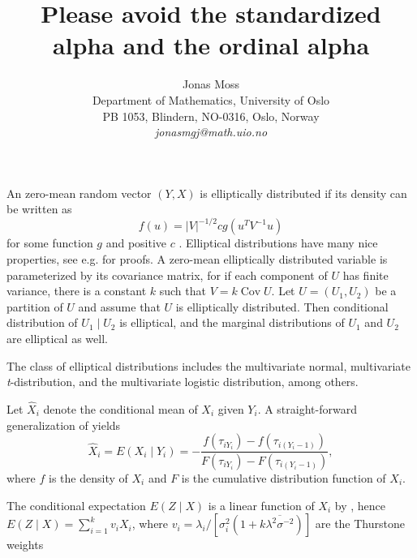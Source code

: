 \documentclass[twoside]{article}
\title{Please avoid the standardized alpha and the ordinal alpha}
\author{
  Jonas Moss \orcid{0000-0002-6876-6964} \\
  Department of Mathematics, University of Oslo\\
  PB 1053, Blindern, NO-0316, Oslo, Norway \\
  \it{jonasmgj@math.uio.no}
}
\DeclareMathOperator{\Cov}{Cov}
\DeclareMathOperator{\tsum}{\textstyle \sum}
\begin{document}
\maketitle



An zero-mean random vector $(Y,X)$ is elliptically distributed if its density can be written as
\begin{equation}
    f(u) = |V|^{-1/2}cg(u^T V^{-1}u)
\end{equation}
for some function $g$ and positive $c$ \citep{Lee1988-sw}. 
Elliptical distributions have many nice properties, see e.g. \citet{Cambanis1981-eg} for proofs.
A zero-mean elliptically distributed variable is parameterized by its covariance matrix, for if each component of $U$ has finite variance, there is a constant $k$ such that $V = k\Cov U$. Let $U = (U_1,U_2)$ be a partition of $U$ and assume that $U$ is elliptically distributed. Then conditional distribution of $U_1 \mid U_2$ is elliptical, and the marginal distributions of $U_1$ and $U_2$ are elliptical as well.

The class of elliptical distributions includes the multivariate normal, multivariate \textit{t}-distribution, and the multivariate logistic distribution, among others. 

Let $\hat{X}_{i}$ denote the conditional mean of $X_i$ given $Y_i$. A straight-forward generalization of \citet[Theorem 1]{Landsman2003-ca} yields
\begin{equation}
\hat{X}_{i}=E(X_i\mid Y_i)=-\frac{f(\tau_{iY_{i}})-f(\tau_{i(Y_{i}-1)})}{F(\tau_{iY_{i}})-F(\tau_{i(Y_{i}-1)})},\label{eq:Predictor of X}
\end{equation}
where $f$ is the density of $X_i$ and $F$ is the cumulative distribution function of $X_i$.

The conditional expectation $E(Z\mid X)$ is a linear function of $X_i$ by \citet[Corollary 5]{Cambanis1981-eg}, hence $E(Z\mid X)=\tsum_{i=1}^{k}v_{i}X_{i}$, where $v_{i}=\lambda_{i}/[\sigma_{i}^{2}(1+k\overline{\lambda^{2}\sigma^{-2}})]$
are the Thurstone weights



\end{document}
